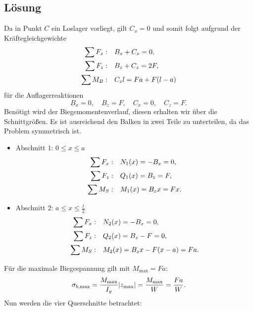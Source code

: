 \documentclass{exercise}
\begin{document}
    \subsection*{Lösung}
    Da in Punkt \(C\) ein Loslager vorliegt, gilt \(C_x = 0\) und somit folgt aufgrund der Kräftegleichgewichte
    \begin{align*}
        \sum F_x: &\quad B_x + C_x = 0,\\
        \sum F_z: &\quad B_z + C_z = 2F,\\
        \sum M_B: &\quad C_z l = Fa + F\parentheses*{l - a}
    \end{align*}
    für die Auflagerreaktionen
    \[
        B_x = 0, \quad B_z = F, \quad C_x = 0, \quad C_z = F.
    \]
    Benötigt wird der Biegemomentenverlauf, diesen erhalten wir über die Schnittgrößen.
    Es ist ausreichend den Balken in zwei Teile zu unterteilen, da das Problem symmetrisch ist.
    \begin{itemize}
        \item Abschnitt \(1\): \(0 \le x \le a\)
        \begin{align*}
            \sum F_x: &\quad N_1\parentheses*{x} = -B_x = 0,\\
            \sum F_z: &\quad Q_1\parentheses*{x} = B_z = F,\\
            \sum M_S: &\quad M_1\parentheses*{x} = B_z x = Fx.
        \end{align*}
        \item Abschnitt \(2\): \(a \le x \le \frac{l}{2}\)
        \begin{align*}
            \sum F_x: &\quad N_2\parentheses*{x} = -B_x = 0,\\
            \sum F_z: &\quad Q_2\parentheses*{x} = B_z - F = 0,\\
            \sum M_S: &\quad M_2\parentheses*{x} = B_z x - F\parentheses*{x - a} = Fa.
        \end{align*}
    \end{itemize}
    Für die maximale Biegespannung gilt mit \(M_{\text{max}} = Fa\):
    \[
        \sigma_{b, \text{max}} = \frac{M_{\text{max}}}{I_y}\absolute*{z_{\text{max}}} = \frac{M_{\text{max}}}{W} = \frac{Fa}{W}.
    \]
    Nun werden die vier Querschnitte betrachtet:
\end{document}
